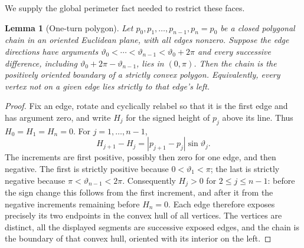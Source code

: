 \documentclass[12pt,reqno]{amsart}
\newtheorem{lemma}[theorem]{Lemma}
\theoremstyle{definition}
\numberwithin{equation}{section}
\begin{document}
We supply the global perimeter fact needed to restrict these faces.
\begin{lemma}[One-turn polygon]\label{r3:topology-one-turn}
Let $p_0,p_1,\ldots,p_{n-1},p_n=p_0$ be a closed polygonal
chain in an oriented Euclidean plane, with all edges nonzero. Suppose
the edge directions have arguments $\vartheta_0<\cdots<\vartheta_{n-1}
<\vartheta_0+2\pi$ and every successive difference, including
$\vartheta_0+2\pi-\vartheta_{n-1}$, lies in $(0,\pi)$.
Then the chain is the positively oriented boundary of a strictly convex
polygon. Equivalently, every vertex not on a given edge lies strictly
to that edge's left.
\end{lemma}
\begin{proof}
Fix an edge, rotate and cyclically relabel so that it is the first edge
and has argument zero, and write $H_j$ for the signed height of $p_j$
above its line. Thus $H_0=H_1=H_n=0$. For $j=1,\ldots,n-1$,
\[
 H_{j+1}-H_j=|p_{j+1}-p_j|\sin\vartheta_j.
\]
The increments are first positive, possibly then zero for one edge,
and then negative. The first is strictly positive because
$0<\vartheta_1<\pi$; the last is strictly negative because
$\pi<\vartheta_{n-1}<2\pi$. Consequently $H_j>0$ for
$2\le j\le n-1$: before the sign change this follows from the first
increment, and after it from the negative increments remaining before
$H_n=0$. Each edge therefore exposes precisely its two endpoints in
the convex hull of all vertices. The vertices are distinct, all the
displayed segments are successive exposed edges, and the chain is the
boundary of that convex hull, oriented with its interior on the left.
\end{proof}
\end{document}

